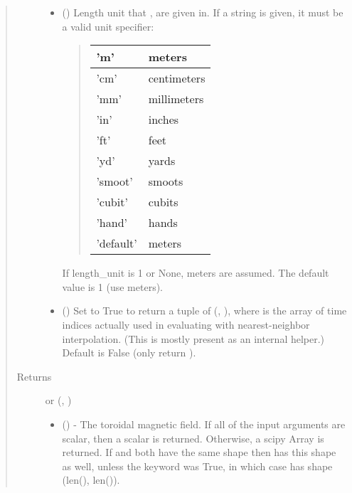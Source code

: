 \documentclass[letterpaper,10pt,english]{sphinxmanual}
\begin{document}
\begin{fulllineitems}
\begin{fulllineitems}
\begin{quote}
\begin{description}
\begin{itemize}
\item {} 
 () \textendash{} 
Length unit that ,  are given in.
If a string is given, it must be a valid unit specifier:
\begin{quote}


\begin{savenotes}\sphinxattablestart
\centering
\begin{tabulary}{\linewidth}[t]{|T|T|}
\hline

’m’
&
meters
\\
\hline
’cm’
&
centimeters
\\
\hline
’mm’
&
millimeters
\\
\hline
’in’
&
inches
\\
\hline
’ft’
&
feet
\\
\hline
’yd’
&
yards
\\
\hline
’smoot’
&
smoots
\\
\hline
’cubit’
&
cubits
\\
\hline
’hand’
&
hands
\\
\hline
’default’
&
meters
\\
\hline
\end{tabulary}
\par
\sphinxattableend\end{savenotes}
\end{quote}

If length\_unit is 1 or None, meters are assumed. The default
value is 1 (use meters).


\item {} 
 () \textendash{} Set to True to return a tuple of (,
), where  is the array of time indices
actually used in evaluating  with nearest-neighbor
interpolation. (This is mostly present as an internal helper.)
Default is False (only return ).

\end{itemize}

\item[{Returns}] \leavevmode

 or (, )
\begin{itemize}
\item {} 
 () - The toroidal magnetic field.
If all of the input arguments are scalar, then a scalar is
returned. Otherwise, a scipy Array is returned. If  and 
both have the same shape then  has this shape as well,
unless the  keyword was True, in which case 
has shape (len(), len()).


\end{itemize}
\end{description}
\end{quote}
\end{fulllineitems}
\end{fulllineitems}
\end{document}
